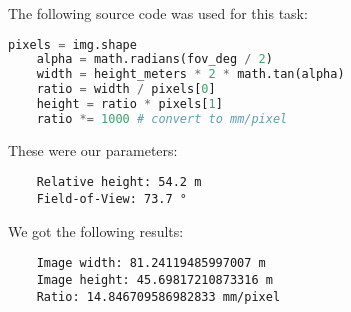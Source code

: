 \documentclass[../Head/Main.tex]{subfiles}
\begin{document}
The following source code was used for this task:

\begin{lstlisting}[language=Python]
    pixels = img.shape
    alpha = math.radians(fov_deg / 2)
    width = height_meters * 2 * math.tan(alpha)
    ratio = width / pixels[0]
    height = ratio * pixels[1]
    ratio *= 1000 # convert to mm/pixel
\end{lstlisting}

These were our parameters:

\begin{verbatim}
    Relative height: 54.2 m
    Field-of-View: 73.7 °
\end{verbatim}


We got the following results:

\begin{verbatim}
    Image width: 81.24119485997007 m
    Image height: 45.69817210873316 m
    Ratio: 14.846709586982833 mm/pixel
\end{verbatim}
\end{document}
